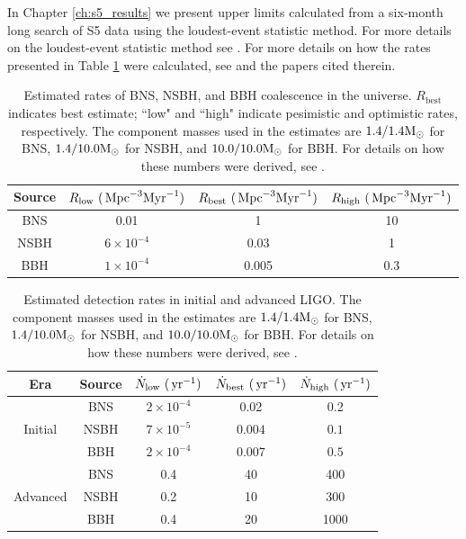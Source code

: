 In Chapter \ref{ch:s5_results} we present upper limits calculated from a six-month long search of \ac{S5} data using the loudest-event statistic method. For more details on the loudest-event statistic method see \cite{ref:uls}. For more details on how the rates presented in Table \ref{tab:bns_bbh_rates} were calculated, see \cite{ref:ratesPaper} and the papers cited therein.

\begin{table}[p]
\center
\begin{tabular}{ c | c | c | c }
\hline
Source  &   $R_{\mathrm{low}}~(\,\mathrm{Mpc}^{-3}\mathrm{Myr}^{-1})$    &   $R_{\mathrm{best}}~(\,\mathrm{Mpc}^{-3}\mathrm{Myr}^{-1})$   &   $R_{\mathrm{high}}~(\,\mathrm{Mpc}^{-3}\mathrm{Myr}^{-1})$ \\
\hline
\ac{BNS}    & 0.01  &   1   &   10 \\
\ac{NSBH}   & $6\times10^{-4}$   &   0.03    & 1 \\
\ac{BBH}    & $1\times10^{-4}$  &   0.005   &   0.3 \\
\hline
\end{tabular}
\caption{Estimated rates of \ac{BNS}, \ac{NSBH}, and \ac{BBH} coalescence in the universe. $R_{\mathrm{best}}$ indicates best estimate; ``low" and ``high" indicate pesimistic and optimistic rates, respectively. The component masses used in the estimates are $1.4/1.4\mathrm{M_\odot}$ for \ac{BNS}, $1.4/10.0\mathrm{M_\odot}$ for \ac{NSBH}, and $10.0/10.0\mathrm{M_\odot}$ for \ac{BBH}. For details on how these numbers were derived, see \cite{ref:rates}.}
\label{tab:bns_bbh_rates}
\end{table}

\begin{table}[p]
\center
\begin{tabular}{ c | c | c | c | c }
\hline
Era &   Source  &   $\dot{N}_{\mathrm{low}}~(\,\mathrm{yr}^{-1})$    &   $\dot{N}_{\mathrm{best}}~(\,\mathrm{yr}^{-1})$   &   $\dot{N}_{\mathrm{high}}~(\,\mathrm{yr}^{-1})$ \\
\hline
\multirow{3}{*}{Initial}    &   \ac{BNS}    & $2\times 10^{-4}$ & 0.02    &   0.2 \\
    &   \ac{NSBH} & $7\times10^{-5}$    &   $0.004$ &   $0.1$ \\
    &   \ac{BBH}  & $2\times10^{-4}$    &   $0.007$ &   $0.5$ \\
\hline
\multirow{3}{*}{Advanced}    &  \ac{BNS}    &  0.4    &   40  &   400 \\
    &   \ac{NSBH}   &   0.2 &   10  &   300 \\
    &   \ac{BBH}    &   0.4 &   20  &   1000 \\
\hline
\end{tabular}
\caption{Estimated detection rates in initial and advanced \ac{LIGO}. The component masses used in the estimates are $1.4/1.4\mathrm{M_\odot}$ for \ac{BNS}, $1.4/10.0\mathrm{M_\odot}$ for \ac{NSBH}, and $10.0/10.0\mathrm{M_\odot}$ for \ac{BBH}. For details on how these numbers were derived, see \cite{ref:rates}.}
\label{tab:detection_rates}
\end{table}


